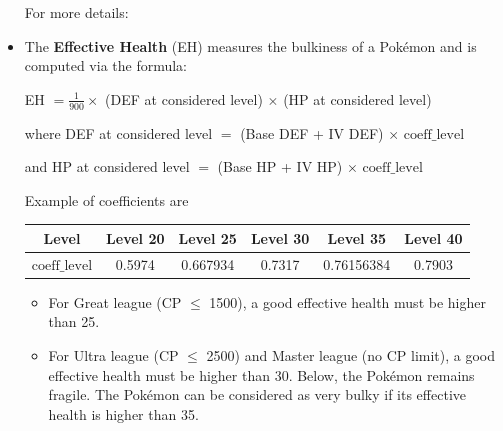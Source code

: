 \documentclass[12pt]{beamer}
\begin{document}
\begin{frame}
\begin{block}{}
\begin{footnotesize}
\begin{itemize}
 For more details: 
 \begin{center}
   \href{https://pokemongohub.net/post/pvp/pvp-move-stats-in-pokemon-go/}{}
   \end{center}
 
 \item The \textbf{Effective Health} (EH) measures the bulkiness of a Pok\'emon and is computed via the formula:
\begin{center}
EH $= \frac{1}{900} \times$ (DEF at considered level) $\times$ (HP at considered level) 
\end{center}

where DEF at considered level $=$ (Base DEF + IV DEF) $\times$ $\text{coeff}\_\text{level}$ 

and HP at considered level $=$ (Base HP + IV HP) $\times$ $\text{coeff}\_\text{level}$

Example of coefficients are

\begin{center}
\begin{tabular}{cccccc} 
Level &   Level 20 &  Level 25 &  Level 30 &  Level 35 &  Level 40 \\ \hline
$\text{coeff}\_\text{level}$ &   0.5974 & 0.667934 & 0.7317 & 0.76156384 & 0.7903 \\
\end{tabular}   
\end{center}

\begin{itemize}
  \item \footnotesize For Great league (CP $\leq$ 1500), a good effective health must be higher than 25.
  \item \footnotesize For Ultra league (CP $\leq$ 2500) and Master league (no CP limit), a good effective health must be higher than 30. Below, the Pok\'emon remains fragile. The Pok\'emon can be considered as very bulky if its effective health is higher than 35.
\end{itemize}

\end{itemize}
\end{footnotesize}
\end{block}
\end{frame}
\end{document}
